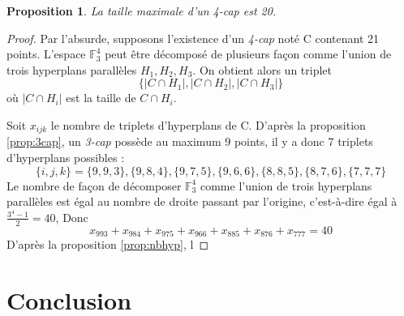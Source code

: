 \documentclass[a4paper,12pt,titlepage]{article}
\theoremstyle{plain}
\newtheorem{prop}{Proposition}
\newcommand{\Ftrois}[1]{\mathbb{F}^#1_3}
\theoremstyle{definition}
\begin{document}
\begin{prop}
La taille maximale d'un \emph{4-cap} est 20.
\end{prop}
\begin{proof}
Par l'absurde, supposons l'existence d'un \emph{4-cap} noté C contenant 21 points.
L'espace $\Ftrois{4}$ peut être décomposé de plusieurs façon comme l'union de trois hyperplans parallèles $H_1,H_2,H_3$.
On obtient alors un triplet 
\[ 
\{|C \cap H_1|,|C \cap H_2|,|C \cap H_3|\}
\]
où $|C \cap H_i|$ est la taille de $C \cap H_i$.

Soit $x_{ijk}$ le nombre de triplets d'hyperplans de C. D'après la proposition \ref{prop:3cap}, un \emph{3-cap} possède au maximum 9 points, il y a donc 7 triplets d'hyperplans possibles : 
\[
\{i,j,k\}=\{9,9,3\},\{9,8,4\},\{9,7,5\},\{9,6,6\},\{8,8,5\},\{8,7,6\},\{7,7,7\}
\]
Le nombre de façon de décomposer $\Ftrois{4}$ comme l'union de trois hyperplans parallèles est égal au nombre de droite passant par l'origine, c'est-à-dire égal à $\frac{3^{4}-1}{2}=40$, Donc
\begin{equation}
x_{993} + x_{984} + x_{975} + x_{966} + x_{885} + x_{876} + x_{777} = 40
\end{equation}
D'après la proposition \ref{prop:nbhyp}, l
\end{proof}

\section{Conclusion}



\end{document}
